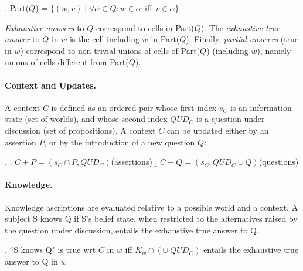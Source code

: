 \ex. Part($Q$) = $\{(w,v) \mid \forall \alpha \in Q: w \in \alpha
\ \ \mbox{iff} \ \ v \in \alpha \}$


\noindent \emph{Exhaustive answers} to $Q$ correspond to cells in
Part($Q$). The \emph{exhaustive true answer} to $Q$ in $w$ is the
cell including $w$ in Part($Q$). Finally, \emph{partial answers}
(true in $w$) correspond to non-trivial unions of cells of
Part($Q$) (including $w$), namely unions of cells different from
Part($Q$).

\paragraph{Context and Updates.} %



A context $C$ is defined as an ordered pair whose first index
$s_C$ is an information state (set of worlds), and whose second
index $QUD_C$ is a question under discussion (set of
propositions). A context $C$ can be updated either by an assertion
$P$, or by the introduction of a new question $Q$:

\ex. \a. $ C + P = (s_C \cap  P, QUD_{C})$\quad (assertions) \b.
$C + Q = (s_C, QUD_{C} \cup Q)$\quad (questions)




\paragraph{Knowledge.} Knowledge ascriptions are evaluated relative
to a possible world and a context. A subject S knows Q if S's
belief state, when restricted to the alternatives raised by the
question under discussion, entails the exhaustive true answer to
Q.

\ex.  ``S knows Q" is true wrt $C$ in $w$ iff $K_w \cap (\cup\
QUD_C)$ entails the exhaustive true answer to Q in $w$



